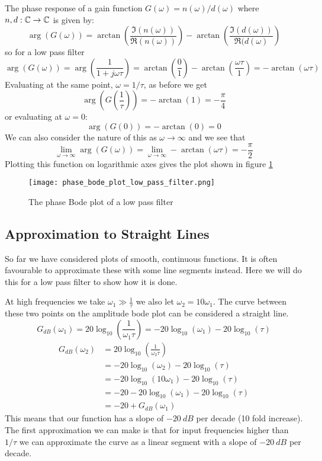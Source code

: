 \documentclass{article}
\begin{document}
    The phase response of a gain function \(G(\omega) = n(\omega)/d(\omega)\) where \(n, d:\mathbb{C}\to\mathbb{C}\) is given by:
    \[\arg(G(\omega)) = \arctan\left(\frac{\Im(n(\omega))}{\Re(n(\omega))}\right) - \arctan\left(\frac{\Im(d(\omega))}{\Re(d(\omega)}\right)\]
    so for a low pass filter
    \[\arg(G(\omega)) = \arg\left(\frac{1}{1 + j\omega \tau}\right) = \arctan\left(\frac{0}{1}\right) - \arctan\left(\frac{\omega\tau}{1}\right) = -\arctan(\omega\tau)\]
    Evaluating at the same point, \(\omega = 1/\tau\), as before we get
    \[\arg\left(G\left(\frac{1}{\tau}\right)\right) = -\arctan(1) = -\frac{\pi}{4}\]
    or evaluating at \(\omega = 0\):
    \[\arg(G(0)) = -\arctan(0) = 0\]
    We can also consider the nature of this as \(\omega \to \infty\) and we see that
    \[\lim_{\omega\to\infty}\arg(G(\omega)) = \lim_{\omega\to\infty}-\arctan(\omega\tau) = -\frac{\pi}{2}\]
    Plotting this function on logarithmic axes gives the plot shown in figure \ref{fig:bode phase plot LPF}
    \begin{figure}[ht]
        \centering
        \texttt{[image: phase\_bode\_plot\_low\_pass\_filter.png]}
        \caption{The phase Bode plot of a low pass filter}
        \label{fig:bode phase plot LPF}
    \end{figure}
    
    \subsection{Approximation to Straight Lines}
    So far we have considered plots of smooth, continuous functions.
    It is often favourable to approximate these with some line segments instead.
    Here we will do this for a low pass filter to show how it is done.
    
    At high frequencies we take \(\omega_1 \gg \frac{1}{\tau}\) we also let \(\omega_2 = 10\omega_1\).
    The curve between these two points on the amplitude bode plot can be considered a straight line.
    \[G_{\si{dB}}(\omega_1) = 20\log_{10}\left(\frac{1}{\omega_1\tau}\right) = -20\log_{10}(\omega_1) - 20\log_{10}(\tau)\]
    \begin{align*}
        G_{\si{dB}}(\omega_2) &= 20\log_{10}\left(\frac{1}{\omega_2\tau}\right)\\
        &= -20\log_{10}(\omega_2) - 20\log_{10}(\tau)\\
        &= -20\log_{10}(10\omega_1) - 20\log_{10}(\tau)\\
        &= -20 -20\log_{10}(\omega_1) - 20\log_{10}(\tau)\\
        &= -20 + G_{\si{dB}}(\omega_1)
    \end{align*}
    This means that our function has a slope of \(-\SI{20}{dB}\) per decade (10 fold increase).
    The first approximation we can make is that for input frequencies higher than \(1/\tau\) we can approximate the curve as a linear segment with a slope of \(-\SI{20}{dB}\) per decade.
    
\end{document}
